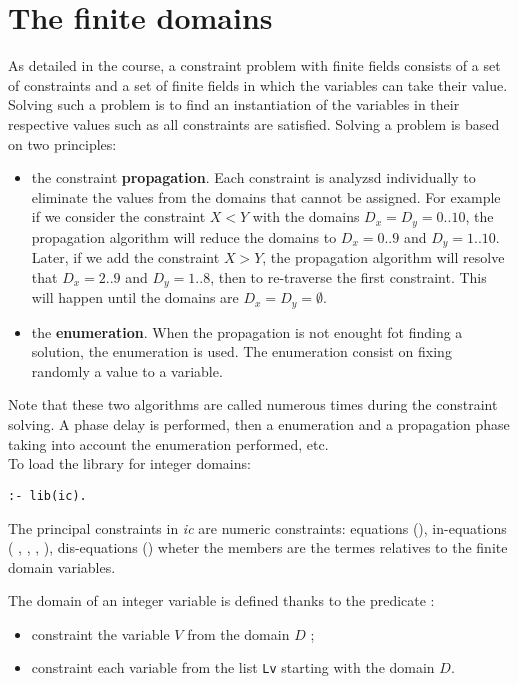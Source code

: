 \section{The finite domains}

As detailed in the course, a constraint problem with finite fields consists of a set of constraints and a set of finite fields in which the variables can take their value. Solving such a problem is to find an instantiation of the variables in their respective values such as all constraints are satisfied. Solving a problem is based on two principles:

\begin{itemize}

\item the constraint \textbf{propagation}. Each constraint is analyzsd individually to eliminate the values from the domains that cannot be assigned. For example if we consider the constraint 
      $X<Y$ with the domains $D_x = D_y = 0 .. 10$, the propagation algorithm will reduce the domains to  $D_x = 0 .. 9$ and $D_y =
      1 .. 10$. Later, if we add the constraint $X>Y$, the propagation algorithm will resolve that  $D_x = 2 .. 9$ and $D_y = 1 .. 8$, then to re-traverse the first constraint. This will happen until the domains are $D_x = D_y
      = \emptyset$.

\item the \textbf{enumeration}. When the propagation is not enought fot finding a solution, the enumeration is used. The enumeration consist on fixing randomly a value to a variable. 
\end{itemize}

Note that these two algorithms are called numerous times during the
constraint solving. A phase delay is performed, then a
enumeration and a propagation phase taking into account the enumeration
performed, etc.\\

To load the library for integer domains:
\begin{verbatim}
:- lib(ic).
\end{verbatim}
The principal constraints in \emph{ic} are numeric constraints:
equations (\code{\#=}), in-equations (\code{\#<} , \code{\#>},
\code{\#=<}, \code{\#>=}), dis-equations (\code{\#$\backslash$=}) wheter the members are the termes relatives to the finite domain variables.

The domain of an integer variable is defined thanks to the predicate  :

\begin{itemize}
\item {} constraint the variable $V$ from the domain $D$ ;
\item {} constraint each variable from the list \verb|Lv|
  starting with the domain $D$.
\end{itemize}

